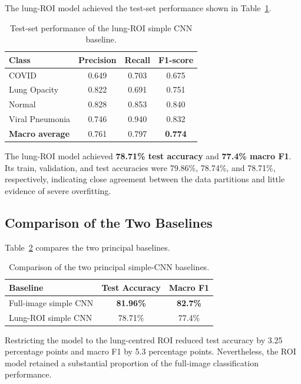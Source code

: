The lung-ROI model achieved the test-set performance shown in
Table~\ref{tab:roi_baseline_results}.

\begin{table}[H]
\centering
\caption{Test-set performance of the lung-ROI simple CNN baseline.}
\label{tab:roi_baseline_results}
\begin{tabular}{lccc}
\toprule
\textbf{Class} & \textbf{Precision} & \textbf{Recall} & \textbf{F1-score} \\
\midrule
COVID            & 0.649 & 0.703 & 0.675 \\
Lung Opacity     & 0.822 & 0.691 & 0.751 \\
Normal           & 0.828 & 0.853 & 0.840 \\
Viral Pneumonia  & 0.746 & 0.940 & 0.832 \\
\midrule
\textbf{Macro average} & 0.761 & 0.797 & \textbf{0.774} \\
\bottomrule
\end{tabular}
\end{table}

The lung-ROI model achieved \textbf{78.71\% test accuracy} and
\textbf{77.4\% macro F1}. Its train, validation, and test accuracies were
79.86\%, 78.74\%, and 78.71\%, respectively, indicating close agreement between
the data partitions and little evidence of severe overfitting.

\subsection{Comparison of the Two Baselines}
\label{subsec:baseline_comparison}

Table~\ref{tab:baseline_comparison} compares the two principal baselines.

\begin{table}[H]
\centering
\caption{Comparison of the two principal simple-CNN baselines.}
\label{tab:baseline_comparison}
\begin{tabular}{lcc}
\toprule
\textbf{Baseline} & \textbf{Test Accuracy} & \textbf{Macro F1} \\
\midrule
Full-image simple CNN & \textbf{81.96\%} & \textbf{82.7\%} \\
Lung-ROI simple CNN   & 78.71\% & 77.4\% \\
\bottomrule
\end{tabular}
\end{table}

Restricting the model to the lung-centred ROI reduced test accuracy by
3.25 percentage points and macro F1 by 5.3 percentage points. Nevertheless,
the ROI model retained a substantial proportion of the full-image
classification performance.

